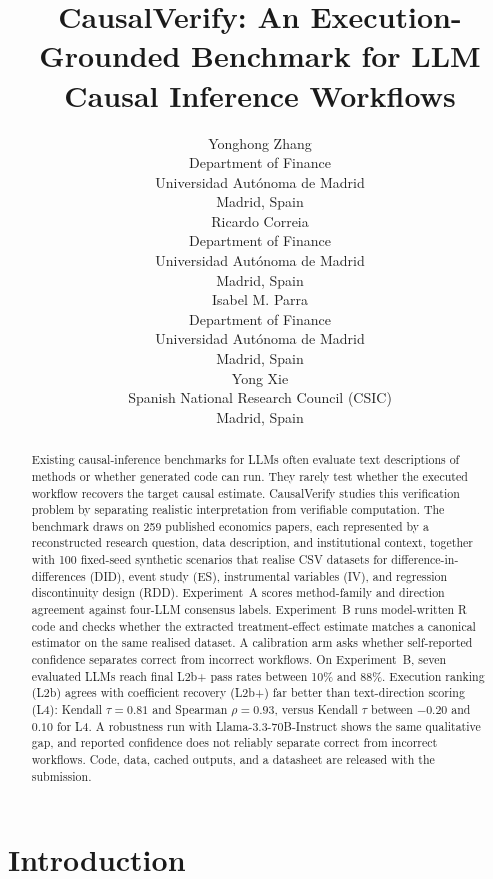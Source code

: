 \documentclass{article}
\title{CausalVerify: An Execution-Grounded Benchmark for LLM\\ Causal Inference Workflows}
\author{%
  Yonghong Zhang \\
  Department of Finance \\
  Universidad Aut\'onoma de Madrid \\
  Madrid, Spain \\
  \And
  Ricardo Correia \\
  Department of Finance \\
  Universidad Aut\'onoma de Madrid \\
  Madrid, Spain \\
  \AND
  Isabel M. Parra \\
  Department of Finance \\
  Universidad Aut\'onoma de Madrid \\
  Madrid, Spain \\
  \And
  Yong Xie \\
  Spanish National Research Council (CSIC) \\
  Madrid, Spain \\
}
\begin{document}
\maketitle

\begin{abstract}
Existing causal-inference benchmarks for LLMs often evaluate text
descriptions of methods or whether generated code can run. They rarely
test whether the executed workflow recovers the target causal estimate.
CausalVerify studies this verification problem by separating realistic
interpretation from verifiable computation. The benchmark draws on 259
published economics papers, each represented by a reconstructed research
question, data description, and institutional context, together with 100
fixed-seed synthetic scenarios that realise CSV datasets for
difference-in-differences (DID), event study (ES), instrumental
variables (IV), and regression discontinuity design (RDD). Experiment~A
scores method-family and direction agreement against four-LLM consensus
labels. Experiment~B runs model-written R code and checks whether the
extracted treatment-effect estimate matches a canonical estimator on the
same realised dataset. A calibration arm asks whether self-reported
confidence separates correct from incorrect workflows. On Experiment~B,
seven evaluated LLMs reach final L2b+ pass rates between 10\% and 88\%.
Execution ranking (L2b) agrees with coefficient recovery (L2b+) far
better than text-direction scoring (L4): Kendall $\tau=0.81$ and Spearman
$\rho=0.93$, versus Kendall $\tau$ between $-0.20$ and $0.10$ for L4. A
robustness run with Llama-3.3-70B-Instruct shows the same qualitative
gap, and reported confidence does not reliably separate correct from
incorrect workflows. Code, data, cached outputs, and a datasheet are
released with the submission.
\end{abstract}

\section{Introduction}
\end{document}
